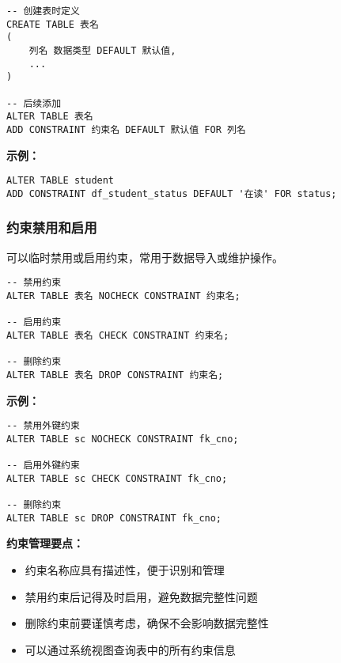 \begin{mdframed}[backgroundcolor=gray!10]
\begin{verbatim}
-- 创建表时定义
CREATE TABLE 表名
(
    列名 数据类型 DEFAULT 默认值,
    ...
)

-- 后续添加
ALTER TABLE 表名
ADD CONSTRAINT 约束名 DEFAULT 默认值 FOR 列名
\end{verbatim}
\end{mdframed}

\textbf{示例：}
\begin{verbatim}
ALTER TABLE student
ADD CONSTRAINT df_student_status DEFAULT '在读' FOR status;
\end{verbatim}

\subsubsection{约束禁用和启用}

\qquad 可以临时禁用或启用约束，常用于数据导入或维护操作。

\begin{mdframed}[backgroundcolor=gray!10]
\begin{verbatim}
-- 禁用约束
ALTER TABLE 表名 NOCHECK CONSTRAINT 约束名;

-- 启用约束
ALTER TABLE 表名 CHECK CONSTRAINT 约束名;

-- 删除约束
ALTER TABLE 表名 DROP CONSTRAINT 约束名;
\end{verbatim}
\end{mdframed}

\textbf{示例：}
\begin{verbatim}
-- 禁用外键约束
ALTER TABLE sc NOCHECK CONSTRAINT fk_cno;

-- 启用外键约束
ALTER TABLE sc CHECK CONSTRAINT fk_cno;

-- 删除约束
ALTER TABLE sc DROP CONSTRAINT fk_cno;
\end{verbatim}

\begin{mdframed}[backgroundcolor=yellow!10]
  \textbf{约束管理要点：}
  \begin{itemize}
    \item 约束名称应具有描述性，便于识别和管理
    \item 禁用约束后记得及时启用，避免数据完整性问题
    \item 删除约束前要谨慎考虑，确保不会影响数据完整性
    \item 可以通过系统视图查询表中的所有约束信息
  \end{itemize}
\end{mdframed}